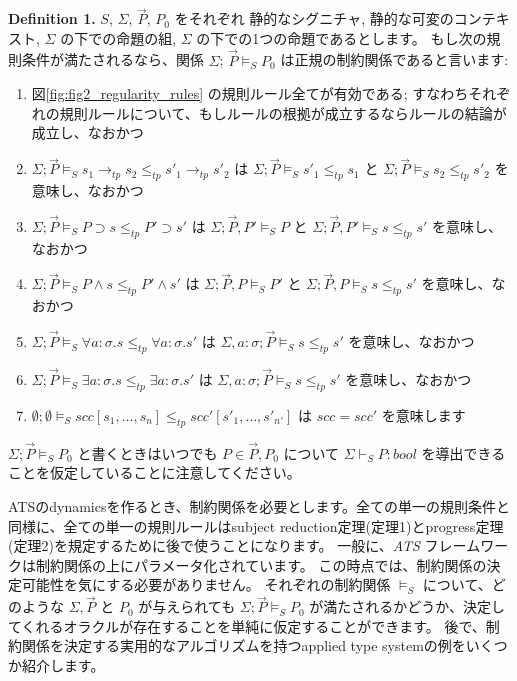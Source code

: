 \documentclass[submit,techreq,noauthor,onecolumn]{ipsj}
\begin{document}
{\bf Definition 1.}
$S$, $\Sigma$, $\vec{P}$, $P_0$ をそれぞれ 静的なシグニチャ, 静的な可変のコンテキスト, $\Sigma$ の下での命題の組, $\Sigma$ の下での1つの命題であるとします。
もし次の規則条件が満たされるなら、関係 $\Sigma$; $\vec{P} \models_S P_0$ は正規の制約関係であると言います:

\begin{enumerate}
  \item 図\ref{fig:fig2_regularity_rules} の規則ルール全てが有効である; すなわちそれぞれの規則ルールについて、もしルールの根拠が成立するならルールの結論が成立し、なおかつ
  \item $\Sigma; \vec{P} \models_S s_1 \rightarrow_{tp} s_2 \leq_{tp} s'_1 \rightarrow_{tp} s'_2$ は $\Sigma; \vec{P} \models_S s'_1 \leq_{tp} s_1$ と $\Sigma; \vec{P} \models_S s_2 \leq_{tp} s'_2$ を意味し、なおかつ
  \item $\Sigma; \vec{P} \models_S P \supset s \leq_{tp} P' \supset s'$ は $\Sigma; \vec{P},P' \models_S P$ と $\Sigma; \vec{P},P' \models_S s \leq_{tp} s'$ を意味し、なおかつ
  \item $\Sigma; \vec{P} \models_S P \wedge s \leq_{tp} P' \wedge s'$ は $\Sigma; \vec{P},P \models_S P'$ と $\Sigma; \vec{P},P \models_S s \leq_{tp} s'$ を意味し、なおかつ
  \item $\Sigma; \vec{P} \models_S \forall a : \sigma.s \leq_{tp} \forall a : \sigma.s'$ は $\Sigma , a: \sigma; \vec{P} \models_S s \leq_{tp} s'$ を意味し、なおかつ
  \item $\Sigma; \vec{P} \models_S \exists a : \sigma.s \leq_{tp} \exists a : \sigma.s'$ は $\Sigma , a: \sigma; \vec{P} \models_S s \leq_{tp} s'$ を意味し、なおかつ
  \item $\emptyset; \emptyset \models_S scc[s_1,\ldots,s_n] \leq_{tp} scc'[s'_1,\ldots,s'_{n'}]$ は $scc = scc'$ を意味します
\end{enumerate}

\noindent $\Sigma; \vec{P} \models_S P_0$ と書くときはいつでも $P \in \vec{P},P_0$ について $\Sigma \vdash_S P : bool$ を導出できることを仮定していることに注意してください。

\noindent ATSのdynamicsを作るとき、制約関係を必要とします。全ての単一の規則条件と同様に、全ての単一の規則ルールはsubject reduction定理(定理1)とprogress定理(定理2)を規定するために後で使うことになります。
一般に、{\it ATS} フレームワークは制約関係の上にパラメータ化されています。
この時点では、制約関係の決定可能性を気にする必要がありません。
それぞれの制約関係 $\models_S$ について、どのような $\Sigma, \vec{P}$ と $P_0$ が与えられても $\Sigma; \vec{P} \models_S P_0$ が満たされるかどうか、決定してくれるオラクルが存在することを単純に仮定することができます。
後で、制約関係を決定する実用的なアルゴリズムを持つapplied type systemの例をいくつか紹介します。
\end{document}
